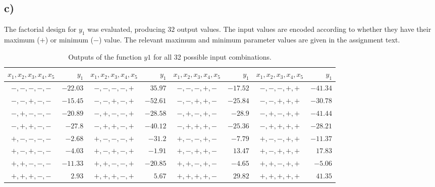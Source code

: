 \subsection*{c)}

The factorial design for $y_1$ was evaluated, producing $32$ output values. The input values are encoded according to whether they have their maximum ($+$) or minimum ($-$) value. The relevant maximum and minimum parameter values are given in the assignment text. \cite[p.4]{homework-w4}

\begin{table}[h!]
\centering
\begin{tabular}{cr|cr|cr|cr}
	$x_1, x_2, x_3, x_4, x_5$ & $y_1$ &$x_1, x_2, x_3, x_4, x_5$ & $y_1$ &$x_1, x_2, x_3, x_4, x_5$ & $y_1$ &$x_1, x_2, x_3, x_4, x_5$ & $y_1$ \\
	\hline
	$-,-,-,-,-$ & $-22.03$ & $-,-,-,-,+$ & $35.97$ & $-,-,-,+,-$ & $-17.52$ & $-,-,-,+,+$ & $-41.34$\\
	$-,-,+,-,-$ & $-15.45$ & $-,-,+,-,+$ & $-52.61$ & $-,-,+,+,-$ & $-25.84$ & $-,-,+,+,+$ & $-30.78$\\
	$-,+,-,-,-$ & $-20.89$ & $-,+,-,-,+$ & $-28.58$ & $-,+,-,+,-$ & $-28.9$ & $-,+,-,+,+$ & $-41.44$\\
	$-,+,+,-,-$ & $-27.8$ & $-,+,+,-,+$ & $-40.12$ & $-,+,+,+,-$ & $-25.36$ & $-,+,+,+,+$ & $-28.21$\\
	$+,-,-,-,-$ & $-2.68$ & $+,-,-,-,+$ & $-31.2$ & $+,-,-,+,-$ & $-7.79$ & $+,-,-,+,+$ & $-11.37$\\
	$+,-,+,-,-$ & $-4.03$ & $+,-,+,-,+$ & $-1.91$ & $+,-,+,+,-$ & $13.47$ & $+,-,+,+,+$ & $17.83$\\
	$+,+,-,-,-$ & $-11.33$ & $+,+,-,-,+$ & $-20.85$ & $+,+,-,+,-$ & $-4.65$ & $+,+,-,+,+$ & $-5.06$\\
	$+,+,+,-,-$ & $2.93$ & $+,+,+,-,+$ & $5.67$ & $+,+,+,+,-$ & $29.82$ & $+,+,+,+,+$ & $41.35$\\
\end{tabular}
\caption{Outputs of the function $y1$ for all 32 possible input combinations.}
\label{tab:outputs_y1}
\end{table}

